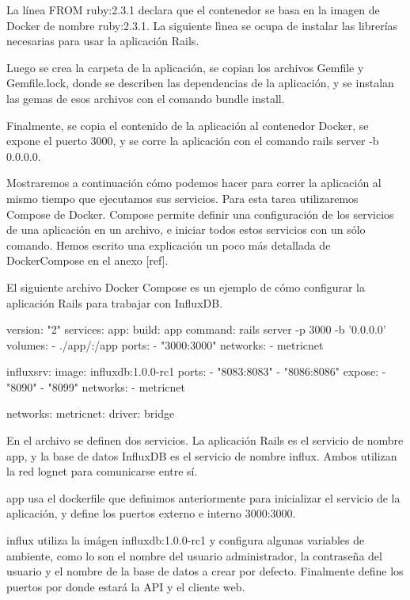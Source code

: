 La línea FROM ruby:2.3.1 declara que el contenedor se basa en la imagen de Docker de nombre ruby:2.3.1. La siguiente lìnea se ocupa de instalar las librerías necesarias para usar la aplicación Rails.

Luego se crea la carpeta de la aplicación, se copian los archivos Gemfile y Gemfile.lock, donde se describen las dependencias de la aplicación, y se instalan las gemas de esos archivos con el comando bundle install.

Finalmente, se copia el contenido de la aplicación al contenedor Docker, se expone el puerto 3000, y se corre la aplicación con el comando rails server -b 0.0.0.0.

Mostraremos a continuación cómo podemos hacer para correr la aplicación al mismo tiempo que ejecutamos sus servicios. Para esta tarea utilizaremos Compose de Docker. Compose permite definir una configuración de los servicios de una aplicación en un archivo, e iniciar todos estos servicios con un sólo comando. Hemos escrito una explicación un poco más detallada de DockerCompose en el anexo [ref].

El siguiente archivo Docker Compose es un ejemplo de cómo configurar la aplicación Rails para trabajar con InfluxDB.

version: "2"
services:
  app:
    build: app
    command: rails server -p 3000 -b '0.0.0.0'
    volumes:
      - ./app/:/app
    ports:
      - "3000:3000"
    networks:
      - metricnet

  influxsrv:
    image: influxdb:1.0.0-rc1
    ports:
      - "8083:8083"
      - "8086:8086"
    expose:
      - "8090"
      - "8099"
    networks:
      - metricnet

networks:
  metricnet:
    driver: bridge

En el archivo se definen dos servicios. La aplicación Rails es el servicio de nombre app, y la base de datos InfluxDB es el servicio de nombre influx. Ambos utilizan la red lognet para comunicarse entre sí.

app usa el dockerfile que definimos anteriormente para inicializar el servicio de la aplicación, y define los puertos externo e interno 3000:3000.

influx utiliza la imágen influxdb:1.0.0-rc1 y configura algunas variables de ambiente, como lo son el nombre del usuario administrador, la contraseña del usuario y el nombre de la base de datos a crear por defecto. Finalmente define los puertos por donde estará la API y el cliente web.

